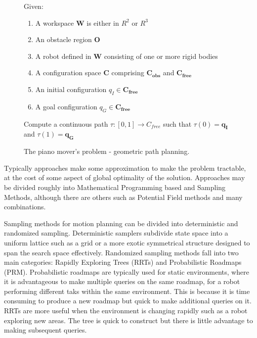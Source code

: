 \begin{figure}
\label{fig:problem_statement}
Given:
\begin{enumerate}
\item A workspace $\mathbf{W}$ is either in $R^2$ or $R^3$
\item An obstacle region $\mathbf{O}$
\item A robot defined in $\mathbf{W}$ consisting of one or more rigid bodies
\item A configuration space $\mathbf{C}$ comprising $\mathbf{C_{obs}}$ and $\mathbf{C_{free}}$
\item An initial configuration $q_I \in \mathbf{C_{free}}$
\item A goal configuration $q_G \in \mathbf{C_{free}}$
\end{enumerate}
Compute a continuous path $\tau : [ 0, 1] \rightarrow C_{free}$ such that $\tau(0)=\mathbf{q_I}$ and $\tau(1) = \mathbf{q_G}$
\caption{The piano mover's problem - geometric path planning.\cite{SicilianoKhatib2016}}
\end{figure}
Typically approaches make some approximation to make the problem tractable, at the cost of some aspect of global optimality of the solution. Approaches may be divided roughly into Mathematical Programming based and Sampling Methods, although there are others such as Potential Field methods and many combinations.

Sampling methods for motion planning can be divided into deterministic and randomized sampling. Deterministic samplers subdivide state space into a uniform lattice such as a grid or a more exotic symmetrical structure designed to span the search space effectively. Randomized sampling methods fall into two main categories: Rapidly Exploring Trees (RRTs) \cite{LaValle2000} and Probabilistic Roadmaps (PRM). Probabilistic roadmaps are typically used for static environments, where it is advantageous to make multiple queries on the same roadmap, for a robot performing different taks within the same environment. This is because it is time consuming to produce a new roadmap but quick to make additional queries on it. RRTs are more useful when the environment is changing rapidly such as a robot exploring new areas. The tree is quick to construct but there is little advantage to making subsequent queries.


